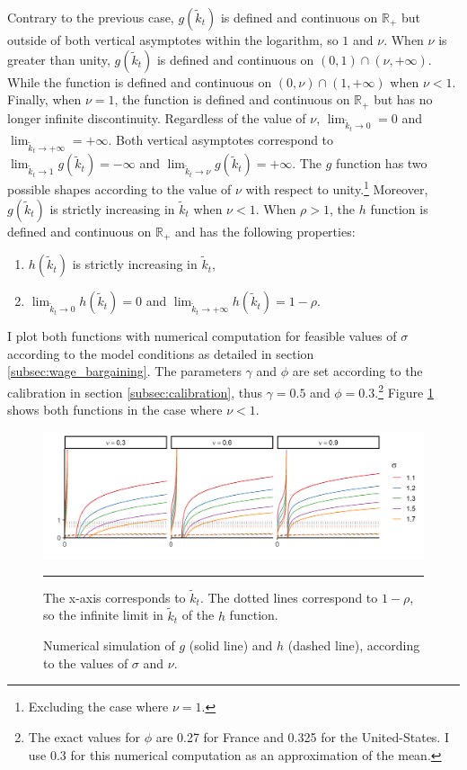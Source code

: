 Contrary to the previous case, $g(\tilde{k}_t)$ is defined and continuous on $\mathbb{R}_+$ but outside of both vertical asymptotes within the logarithm, so $1$ and $\nu$. When $\nu$ is greater than unity, $g(\tilde{k}_t)$ is defined and continuous on $(0, 1) \cap (\nu, +\infty)$. While the function is defined and continuous on $(0, \nu) \cap (1, +\infty)$ when $\nu < 1$. Finally, when $\nu = 1$, the function is defined and continuous on $\mathbb{R}_+$ but has no longer infinite discontinuity. Regardless of the value of $\nu$, $\lim_{\tilde{k}_t\to 0} = 0$ and $\lim_{\tilde{k}_t\to +\infty} = +\infty$. Both vertical asymptotes correspond to $\lim_{\tilde{k}_t\to 1} g(\tilde{k}_t) = -\infty$ and $\lim_{\tilde{k}_t\to \nu} g(\tilde{k}_t) = +\infty$. The $g$ function has two possible shapes according to the value of $\nu$ with respect to unity.\footnote{Excluding the case where $\nu=1$.} Moreover, $g(\tilde{k}_t)$ is strictly increasing in $\tilde{k}_t$ when $\nu < 1$. When $\rho > 1$, the $h$ function is defined and continuous on $\mathbb{R}_+$ and has the following properties:
\begin{enumerate}
	\item $h(\tilde{k}_t)$ is strictly increasing in $\tilde{k}_t$,
	\item $\lim_{\tilde{k}_t\to 0} h(\tilde{k}_t) = 0$ and $\lim_{\tilde{k}_t\to +\infty} h(\tilde{k}_t) = 1-\rho$.
\end{enumerate}
I plot both functions with numerical computation for feasible values of $\sigma$ according to the model conditions as detailed in section \ref{subsec:wage_bargaining}. The parameters $\gamma$ and $\phi$ are set according to the calibration in section \ref{subsec:calibration}, thus $\gamma = 0.5$ and $\phi = 0.3$.\footnote{The exact values for $\phi$ are 0.27 for France and 0.325 for the United-States. I use 0.3 for this numerical computation as an approximation of the mean.} Figure \ref{fig:gh2} shows both functions in the case where $\nu < 1$.
\begin{figure}[tb]
	\centering
	\includegraphics[width = 1\linewidth]{../result/appendix_A/uniqueness/gd_all.png}
	\caption{Numerical simulation of $g$ (solid line) and $h$ (dashed line), according to the values of $\sigma$ and $\nu$.}
	\label{fig:gh2}
	\vspace{.5ex}
	\hrule
	\vspace{-4ex}
	\justify\singlespacing\footnotesize The x-axis corresponds to $\tilde{k}_t$. The dotted lines correspond to $1-\rho$, so the infinite limit in $\tilde{k}_t$ of the $h$ function.
\end{figure}
